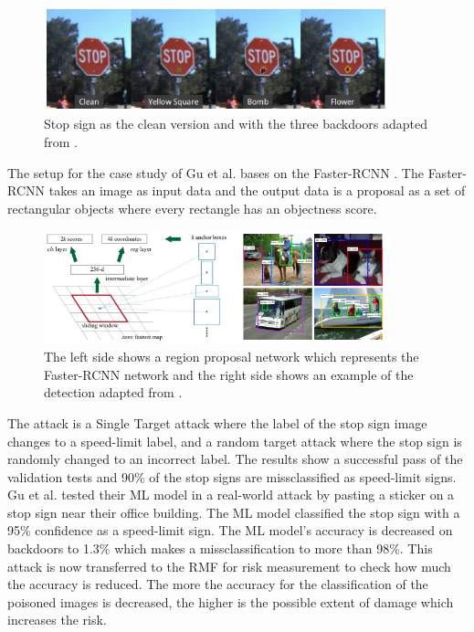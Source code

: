 \begin{figure}[ht!]
  \centering
  \includegraphics[width=10cm]{pictures/stop_sign.jpg}
  \caption{Stop sign as the clean version and with the three backdoors adapted from \cite{DBLP:journals/corr/abs-1708-06733}.}
  \label{fig:stop_sign}
\end{figure}

The setup for the case study of Gu et al. bases on the Faster-RCNN \cite{DBLP:conf/nips/RenHGS15}. The Faster-RCNN takes an image as input data and the output data is a proposal as a set of rectangular objects where every rectangle has an objectness score.

\begin{figure}[ht!]
  \centering
  \includegraphics[width=10cm]{pictures/f_rcnn.jpg}
  \caption{The left side shows a region proposal network which represents the Faster-RCNN network and the right side shows an example of the detection adapted from \cite{DBLP:conf/nips/RenHGS15}.}
  \label{fig:f_rcnn}
\end{figure}

The attack is a Single Target attack where the label of the stop sign image changes to a speed-limit label, and a random target attack where the stop sign is randomly changed to an incorrect label. The results show a successful pass of the validation tests and 90\% of the stop signs are missclassified as speed-limit signs. Gu et al. tested their ML model in a real-world attack by pasting a sticker on a stop sign near their office building. The ML model classified the stop sign with a 95\% confidence as a speed-limit sign. The ML model's accuracy is decreased on backdoors to 1.3\% which makes a missclassification to more than 98\%. This attack is now transferred to the RMF for risk measurement to check how much the accuracy is reduced. The more the accuracy for the classification of the poisoned images is decreased, the higher is the possible extent of damage which increases the risk. \\

